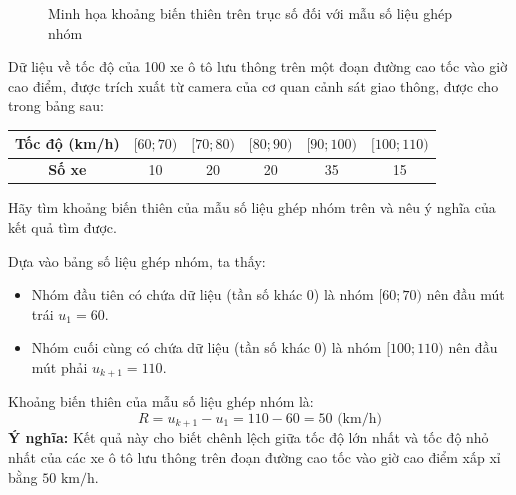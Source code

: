 \documentclass[12pt]{article}
\begin{document}
	\begin{figure}[H]
		\centering
		\caption{Minh họa khoảng biến thiên trên trục số đối với mẫu số liệu ghép nhóm}
	\end{figure}
	
	\begin{vidu}[1]
		Dữ liệu về tốc độ của 100 xe ô tô lưu thông trên một đoạn đường cao tốc vào giờ cao điểm, được trích xuất từ camera của cơ quan cảnh sát giao thông, được cho trong bảng sau:
		\begin{center}
			\renewcommand{\arraystretch}{1.3}
			\begin{tabular}{|c|c|c|c|c|c|}
				\hline
				\textbf{Tốc độ (km/h)} & $[60;70)$ & $[70;80)$ & $[80;90)$ & $[90;100)$ & $[100;110)$ \\
				\hline
				\textbf{Số xe} & 10 & 20 & 20 & 35 & 15 \\
				\hline
			\end{tabular}
		\end{center}
		Hãy tìm khoảng biến thiên của mẫu số liệu ghép nhóm trên và nêu ý nghĩa của kết quả tìm được.
	\end{vidu}
	
	\begin{loigiai}
		Dựa vào bảng số liệu ghép nhóm, ta thấy:
		\begin{itemize}
			\item Nhóm đầu tiên có chứa dữ liệu (tần số khác 0) là nhóm $[60; 70)$ nên đầu mút trái $u_1 = 60$.
			\item Nhóm cuối cùng có chứa dữ liệu (tần số khác 0) là nhóm $[100; 110)$ nên đầu mút phải $u_{k+1} = 110$.
		\end{itemize}
		Khoảng biến thiên của mẫu số liệu ghép nhóm là:
		\[ R = u_{k+1} - u_1 = 110 - 60 = 50 \text{ (km/h)} \]
		\textbf{Ý nghĩa:} Kết quả này cho biết chênh lệch giữa tốc độ lớn nhất và tốc độ nhỏ nhất của các xe ô tô lưu thông trên đoạn đường cao tốc vào giờ cao điểm xấp xỉ bằng $50 \text{ km/h}$.
	\end{loigiai}
	
\end{document}
